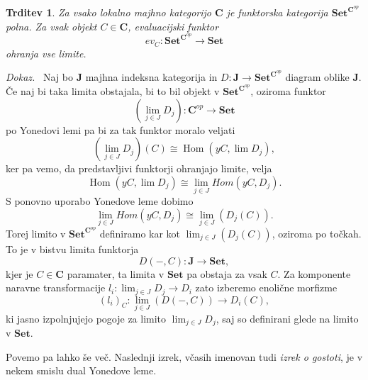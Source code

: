 \documentclass[12pt,a4paper]{book}
\theoremstyle{definition}
\theoremstyle{plain}
\newtheorem{trditev}[definicija]{Trditev}
\newenvironment{dokaz}{\emph{Dokaz.}\ }{\hspace{\fill}{$\Box$}}
\theoremstyle{definition}
\theoremstyle{remark}
\newcommand{\cat}[1]{\textbf{#1}}
\DeclareMathOperator{\Hom}{Hom}
\newcommand{\predsnop}[1]{\cat{Set}^{\cat{#1}^{op}}}
\begin{document}
\begin{trditev} \label{trditev 3.3}
Za vsako lokalno majhno kategorijo $\cat{C}$ je funktorska kategorija $\predsnop{C}$ polna. Za vsak objekt $C \in \cat{C}$, evaluacijski funktor 
$$ev_C : \predsnop{C} \to \cat{Set}$$
ohranja vse limite.
\end{trditev}
\begin{dokaz}
Naj bo $\cat{J}$ majhna indeksna kategorija in $D : \cat{J} \to \cat{Set}^{\cat{C}^{op}}$ diagram oblike $\cat{J}$. Če naj bi taka limita obstajala, bi to bil objekt v $\cat{Set}^{\cat{C}^{op}}$, oziroma funktor 
$$(\lim_{j \in J} D_j): \cat{C}^{op} \to \cat{Set}$$
po Yonedovi lemi pa bi za tak funktor moralo veljati
$$(\lim_{j \in J} D_j)(C) \cong \Hom(yC, \lim D_j),$$
ker pa vemo, da predstavljivi funktorji ohranjajo limite, velja
$$\Hom(yC, \lim D_j) \cong \lim_{j \in J} Hom(yC, D_j).$$
S ponovno uporabo Yonedove leme dobimo
$$\lim_{j \in J} Hom(yC, D_j) \cong \lim_{j \in J} (D_j(C)).$$
Torej limito v $\predsnop{C}$ definiramo kar kot $\lim_{j \in J} (D_j(C))$, oziroma po točkah. To je v bistvu limita funktorja 
$$D(-,C) : \cat{J} \to \cat{Set},$$
kjer je $C \in \cat{C}$ paramater, ta limita v $\cat{Set}$ pa obstaja za vsak $C$.
Za komponente naravne transformacije $l_i : \lim_{j \in J} D_j \to D_i$ zato izberemo enolične morfizme
$$(l_i)_C : \lim_{j \in J}(D(-,C)) \to D_i(C),$$
ki jasno izpolnjujejo pogoje za limito $\lim_{j \in J} D_j$, saj so definirani glede na limito v $\cat{Set}$.
\end{dokaz}

Povemo pa lahko še več. Naslednji izrek, včasih imenovan tudi \emph{izrek o gostoti}, je v nekem smislu dual Yonedove leme.
\end{document}
